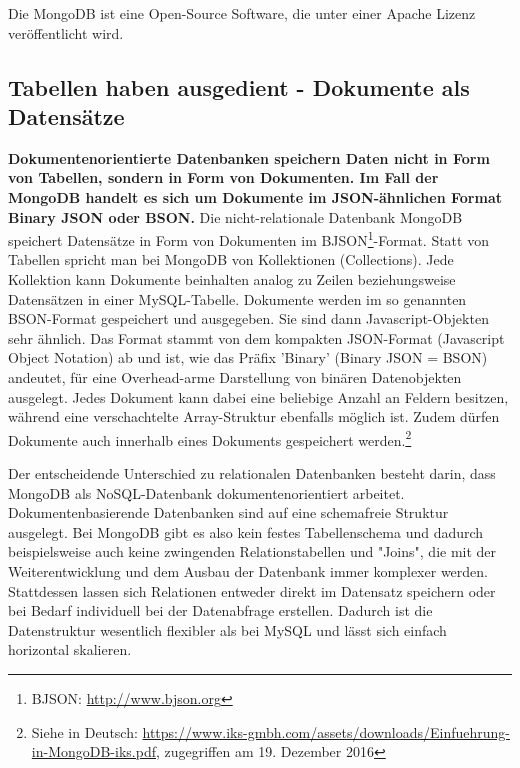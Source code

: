 Die MongoDB ist eine Open-Source Software, die unter einer Apache Lizenz veröffentlicht wird. 

\subsection{Tabellen haben ausgedient - Dokumente als Datensätze}
\textbf{ Dokumentenorientierte Datenbanken speichern Daten nicht in Form von Tabellen, sondern in Form von Dokumenten. Im Fall der MongoDB handelt es sich um Dokumente im JSON-ähnlichen Format Binary JSON oder BSON.}
Die nicht-relationale Datenbank MongoDB speichert Datensätze in Form von Dokumenten im BJSON\footnote{BJSON: \url{http://www.bjson.org}}-Format. Statt von Tabellen spricht man bei MongoDB von Kollektionen (Collections). Jede Kollektion kann Dokumente beinhalten analog zu Zeilen beziehungsweise Datensätzen in einer MySQL-Tabelle. Dokumente werden im so genannten BSON-Format gespeichert und ausgegeben. Sie sind dann Javascript-Objekten sehr ähnlich. Das Format stammt von dem kompakten JSON-Format (Javascript Object Notation) ab und ist, wie das Präfix 'Binary' (Binary JSON = BSON) andeutet, für eine Overhead-arme Darstellung von binären Datenobjekten ausgelegt. Jedes Dokument kann dabei eine beliebige Anzahl an Feldern besitzen, während eine verschachtelte Array-Struktur ebenfalls möglich ist. Zudem dürfen Dokumente auch innerhalb eines Dokuments gespeichert werden.\footnote{Siehe in Deutsch: \url{https://www.iks-gmbh.com/assets/downloads/Einfuehrung-in-MongoDB-iks.pdf}, zugegriffen am 19. Dezember 2016}

Der entscheidende Unterschied zu relationalen Datenbanken besteht darin, dass MongoDB als NoSQL-Datenbank dokumentenorientiert arbeitet. Dokumentenbasierende Datenbanken sind auf eine schemafreie Struktur ausgelegt. Bei MongoDB gibt es also kein festes Tabellenschema und dadurch beispielsweise auch keine zwingenden Relationstabellen und "Joins", die mit der Weiterentwicklung und dem Ausbau der Datenbank immer komplexer werden. Stattdessen lassen sich Relationen entweder direkt im Datensatz speichern oder bei Bedarf individuell bei der Datenabfrage erstellen. Dadurch ist die Datenstruktur wesentlich flexibler als bei MySQL und lässt sich einfach horizontal skalieren.

